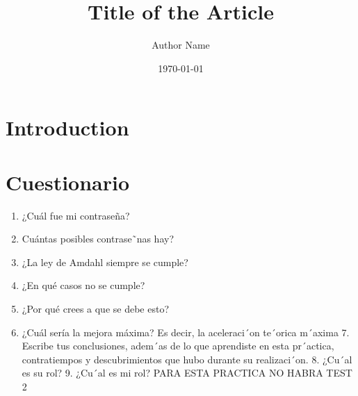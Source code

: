 \documentclass{article}
\title{Title of the Article}
\author{Author Name}
\date{\today}
\begin{document}
\maketitle

\section{Introduction}

\section{Cuestionario}

\begin{enumerate}
    \item ¿Cuál fue mi contraseña?
    \item Cuántas posibles contrase˜nas hay?
    \item ¿La ley de Amdahl siempre se cumple?
    \item ¿En qué casos no se cumple?
    \item ¿Por qué crees a que se debe esto?
    \item ¿Cuál sería la mejora máxima? Es decir, la aceleraci´on te´orica m´axima
    7. Escribe tus conclusiones, adem´as de lo que aprendiste en esta pr´actica, contratiempos y
    descubrimientos que hubo durante su realizaci´on.
    8. ¿Cu´al es su rol?
    9. ¿Cu´al es mi rol?
    PARA ESTA PRACTICA NO HABRA TEST
    2
    
\end{enumerate}
\end{document}
